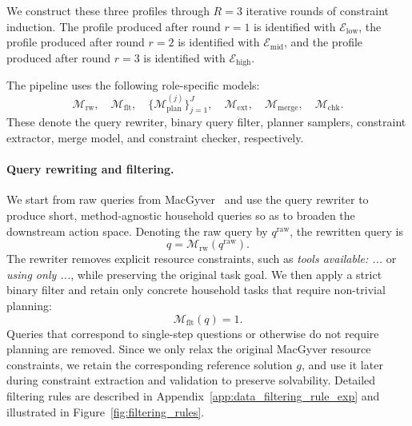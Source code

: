 We construct these three profiles through $R = 3$ iterative rounds of constraint induction. The profile produced after round $r = 1$ is identified with  $\mathcal{E}_{\mathrm{low}}$, the profile produced after round $r = 2$ is identified with $\mathcal{E}_{\mathrm{mid}}$, and the profile produced after round $r = 3$ is identified with $\mathcal{E}_{\mathrm{high}}$.

The pipeline uses the following role-specific models:
\[
\mathcal{M}_{\mathrm{rw}},
\quad
\mathcal{M}_{\mathrm{flt}},
\quad
\{\mathcal{M}^{(j)}_{\mathrm{plan}}\}_{j=1}^{J},
\quad
\mathcal{M}_{\mathrm{ext}},
\quad
\mathcal{M}_{\mathrm{merge}},
\quad
\mathcal{M}_{\mathrm{chk}}.
\]
These denote the query rewriter, binary query filter, planner samplers, constraint extractor, merge model, and constraint checker, respectively. 

\paragraph{Query rewriting and filtering.}
We start from raw queries from MacGyver~\citep{MacGyver} and use the query rewriter to produce short, method-agnostic household queries so as to broaden the downstream action space. Denoting the raw query by $q^{\mathrm{raw}}$, the rewritten query is
\[
q
=
\mathcal{M}_{\mathrm{rw}}
\left(
q^{\mathrm{raw}}
\right).
\]
The rewriter removes explicit resource constraints, such as \textit{tools available: ...} or \textit{using only ...}, while preserving the original task goal.
We then apply a strict binary filter and retain only concrete household tasks that require non-trivial planning:
\[
\mathcal{M}_{\mathrm{flt}}(q) = 1.
\]
Queries that correspond to single-step questions or otherwise do not require planning are removed. Since we only relax the original MacGyver resource constraints, we retain the corresponding reference solution $g$, and use it later during constraint extraction and validation to preserve solvability. Detailed filtering rules are described in Appendix~\ref{app:data_filtering_rule_exp} and illustrated in Figure~\ref{fig:filtering_rules}.

